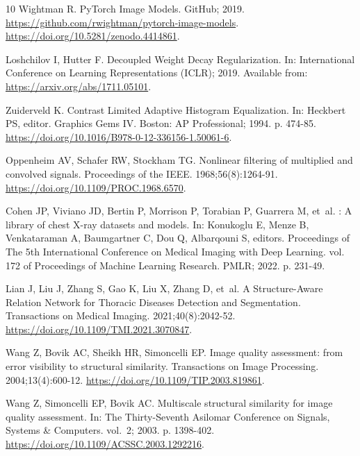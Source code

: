 \begin{thebibliography}{10}
Wightman R. {PyTorch} Image Models. GitHub; 2019.
\newblock \url{https://github.com/rwightman/pytorch-image-models}.
\newblock \url{https://doi.org/10.5281/zenodo.4414861}.

Loshchilov I, Hutter F.
\newblock Decoupled Weight Decay Regularization.
\newblock In: International Conference on Learning Representations ({ICLR});
  2019. Available from: \url{https://arxiv.org/abs/1711.05101}.

Zuiderveld K.
\newblock Contrast Limited Adaptive Histogram Equalization.
\newblock In: Heckbert PS, editor. Graphics Gems {IV}. Boston: AP Professional;
  1994. p. 474-85.
\newblock \url{https://doi.org/10.1016/B978-0-12-336156-1.50061-6}.

Oppenheim AV, Schafer RW, Stockham TG.
\newblock Nonlinear filtering of multiplied and convolved signals.
\newblock Proceedings of the {IEEE}. 1968;56(8):1264-91.
\newblock \url{https://doi.org/10.1109/PROC.1968.6570}.

Cohen JP, Viviano JD, Bertin P, Morrison P, Torabian P, Guarrera M, et~al.
: A library of chest {X}-ray datasets and models.
\newblock In: Konukoglu E, Menze B, Venkataraman A, Baumgartner C, Dou Q,
  Albarqouni S, editors. Proceedings of The 5th International Conference on
  Medical Imaging with Deep Learning. vol. 172 of Proceedings of Machine
  Learning Research. PMLR; 2022. p. 231-49.

Lian J, Liu J, Zhang S, Gao K, Liu X, Zhang D, et~al.
\newblock A Structure-Aware Relation Network for Thoracic Diseases Detection
  and Segmentation.
 Transactions on Medical Imaging. 2021;40(8):2042-52.
\newblock \url{https://doi.org/10.1109/TMI.2021.3070847}.

Wang Z, Bovik AC, Sheikh HR, Simoncelli EP.
\newblock Image quality assessment: from error visibility to structural
  similarity.
 Transactions on Image Processing. 2004;13(4):600-12.
\newblock \url{https://doi.org/10.1109/TIP.2003.819861}.

Wang Z, Simoncelli EP, Bovik AC.
\newblock Multiscale structural similarity for image quality assessment.
\newblock In: The Thirty-Seventh Asilomar Conference on Signals, Systems \&
  Computers. vol.~2; 2003. p. 1398-402.
\newblock \url{https://doi.org/10.1109/ACSSC.2003.1292216}.


\end{thebibliography}
